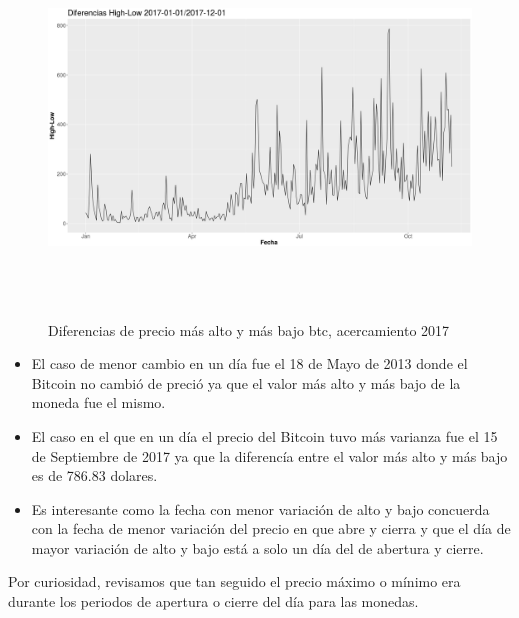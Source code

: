 \documentclass[12pt,letterpaper]{article}
\begin{document}
    \begin{figure}
        \centering

        \includegraphics[width = 18cm, height = 10cm]{btc/diferencias_BTC_HighLow_2}

        \caption{Diferencias de precio m\'as alto y m\'as bajo btc, acercamiento 2017}
    \end{figure}


    \begin{itemize}

        \item El caso de menor cambio en un d\'ia fue el 18 de Mayo de 2013 donde el Bitcoin no cambi\'o de preci\'o ya que el valor m\'as alto y m\'as bajo de la moneda fue el mismo.

        \item El caso en el que en un d\'ia el precio del Bitcoin tuvo m\'as varianza fue el 15 de Septiembre de 2017 ya que la diferenc\'ia entre el valor m\'as alto y m\'as bajo es de 786.83 dolares.

        \item Es interesante como la fecha con menor variaci\'on de alto y bajo concuerda con la fecha de menor variaci\'on del precio en que abre y cierra y que el d\'ia de mayor variaci\'on de alto y bajo est\'a a solo un d\'ia del de abertura y cierre.

    \end{itemize}


    Por curiosidad, revisamos que tan seguido el precio máximo o mínimo era durante los periodos de apertura o cierre del día para las monedas.
\end{document}
